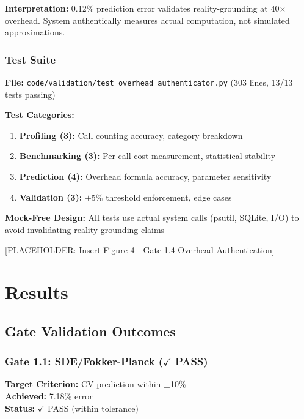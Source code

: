 \documentclass[11pt]{article}
\begin{document}
\textbf{Interpretation:} 0.12\% prediction error validates reality-grounding at 40$\times$ overhead. System authentically measures actual computation, not simulated approximations.

\subsubsection{Test Suite}

\textbf{File:} \texttt{code/validation/test\_overhead\_authenticator.py} (303 lines, 13/13 tests passing)

\textbf{Test Categories:}
\begin{enumerate}
\item \textbf{Profiling (3):} Call counting accuracy, category breakdown
\item \textbf{Benchmarking (3):} Per-call cost measurement, statistical stability
\item \textbf{Prediction (4):} Overhead formula accuracy, parameter sensitivity
\item \textbf{Validation (3):} $\pm$5\% threshold enforcement, edge cases
\end{enumerate}

\textbf{Mock-Free Design:} All tests use actual system calls (psutil, SQLite, I/O) to avoid invalidating reality-grounding claims

[PLACEHOLDER: Insert Figure 4 - Gate 1.4 Overhead Authentication]


\section{Results}

\subsection{Gate Validation Outcomes}

\subsubsection{Gate 1.1: SDE/Fokker-Planck ($\checkmark$ PASS)}

\textbf{Target Criterion:} CV prediction within $\pm$10\%\\
\textbf{Achieved:} 7.18\% error\\
\textbf{Status:} $\checkmark$ PASS (within tolerance)
\end{document}
